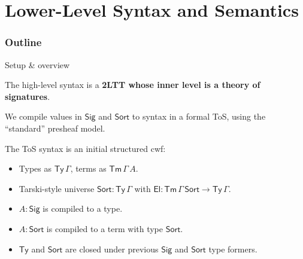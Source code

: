 \documentclass[dvipsnames]{beamer}
\newcommand{\Tm}{\mathsf{Tm}}
\newcommand{\Ty}{\mathsf{Ty}}
\newcommand{\El}{\mathsf{El}}
\newcommand{\Sort}{\mathsf{Sort}}
\newcommand{\Sig}{\mathsf{Sig}}
\begin{document}
\section{Lower-Level Syntax and Semantics}
\begin{frame}
  \frametitle{Outline}
  \tableofcontents[currentsection]
\end{frame}

\begin{frame}{Setup \& overview}

The high-level syntax is a \textbf{2LTT whose inner level is a theory of signatures}.
\vspace{1em}

We compile values in $\Sig$ and $\Sort$ to syntax in a formal ToS,
using the ``standard'' presheaf model.
\vspace{1em}

The ToS syntax is an initial structured cwf:
\begin{itemize}
  \item Types as $\Ty\,\Gamma$, terms as $\Tm\,\Gamma\,A$.
  \item Tarski-style universe $\Sort : \Ty\,\Gamma$ with
        $\El : \Tm\,\Gamma\,\Sort \to \Ty\,\Gamma$.
  \item $A : \Sig$ is compiled to a type.
  \item $A : \Sort$ is compiled to a term with type $\Sort$.
  \item $\Ty$ and $\Sort$ are closed under previous $\Sig$ and $\Sort$
        type formers.
\end{itemize}

\end{frame}
\end{document}
